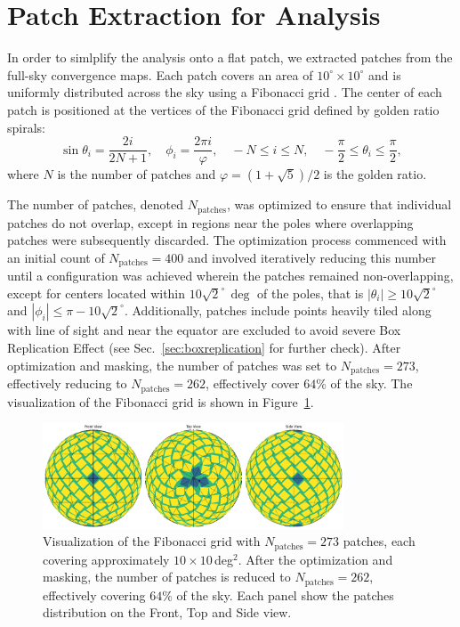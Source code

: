 \section{Patch Extraction for Analysis}
In order to simlplify the analysis onto a flat patch, we extracted patches from the full-sky convergence maps. Each patch covers an area of $10^\circ \times 10^\circ$ and is uniformly distributed across the sky using a Fibonacci grid \citep{2006QJRMS.132.1769S, 2023MNRAS.524.5591F}. The center of each patch is positioned at the vertices of the Fibonacci grid defined by golden ratio spirals:
\begin{equation}
    \sin \theta_i = \frac{2i}{2N + 1}, \quad \phi_i = \frac{2 \pi i}{\varphi}, \quad -N \leq i \leq N, \quad -\frac{\pi}{2} \leq \theta_i \leq \frac{\pi}{2},
\end{equation}
where $N$ is the number of patches and $\varphi = (1 + \sqrt{5})/2$ is the golden ratio.

The number of patches, denoted \( N_{\text{patches}} \), was optimized to ensure that individual patches do not overlap, except in regions near the poles where overlapping patches were subsequently discarded. The optimization process commenced with an initial count of \( N_{\text{patches}} = 400 \) and involved iteratively reducing this number until a configuration was achieved wherein the patches remained non-overlapping, except for centers located within \( 10\sqrt{2}^\circ \, \mathrm{\deg}\) of the poles, that is $|\theta_i| \geq 10\sqrt{2}^\circ$ and $|\phi_i| \leq \pi - 10\sqrt{2}^\circ$. Additionally, patches include points heavily tiled along with line of sight and near the equator are excluded to avoid severe Box Replication Effect (see Sec.~\ref{sec:boxreplication} for further check).
After optimization and masking, the number of patches was set to $N_{\text{patches}} = 273$, effectively reducing to $N_{\text{patches}} = 262$, effectively cover $64 \%$ of the sky. The visualization of the Fibonacci grid is shown in Figure~\ref{fig:fibonacci}.
\begin{figure}[ht]
    \centering
    \includegraphics[width=0.8\textwidth]{figures/fibonacci_grid.png}
    \caption{Visualization of the Fibonacci grid with $N_{\text{patches}} = 273$ patches, each covering approximately $10 \times 10$\,deg$^2$. 
    After the optimization and masking, the number of patches is reduced to $N_{\text{patches}} = 262$, effectively covering $64 \%$ of the sky.
    Each panel show the patches distribution on the Front, Top and Side view.}\label{fig:fibonacci}
\end{figure}

